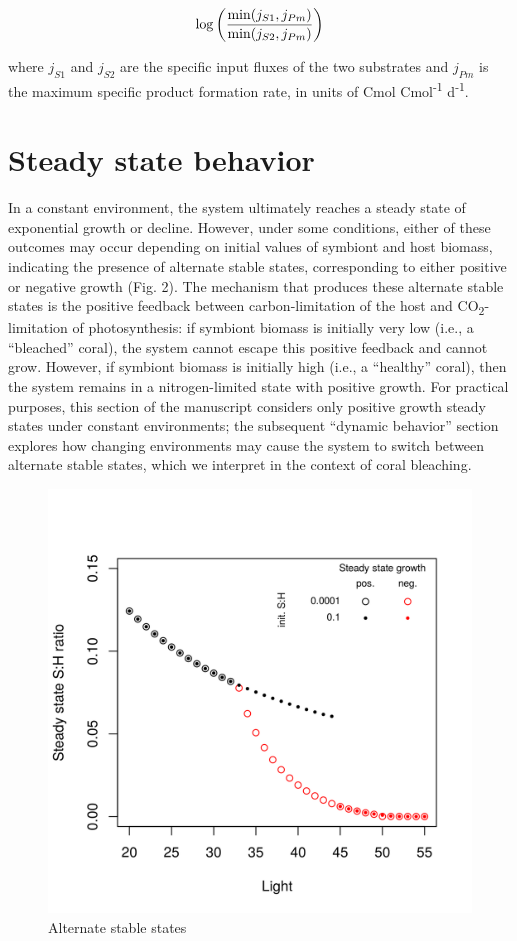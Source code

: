 \documentclass[]{elsarticle} %
\makeatletter
\def\maxwidth{\ifdim\Gin@nat@width>\linewidth\linewidth
\else\Gin@nat@width\fi}
\let\Oldincludegraphics\includegraphics
\renewcommand{\includegraphics}[1]{\Oldincludegraphics[width=\maxwidth]{#1}}
\makeatother
\begin{document}
\begin{equation} \log \bigg({{\min(j_{S1}, j_{Pm})} \over {\min(j_{S2}, j_{Pm})}}\bigg) \end{equation}

where \(j_{S1}\) and \(j_{S2}\) are the specific input fluxes of the two
substrates and \(j_{Pm}\) is the maximum specific product formation
rate, in units of Cmol Cmol\textsuperscript{-1} d\textsuperscript{-1}.

\section{Steady state behavior}\label{steady-state-behavior}

In a constant environment, the system ultimately reaches a steady state
of exponential growth or decline. However, under some conditions, either
of these outcomes may occur depending on initial values of symbiont and
host biomass, indicating the presence of alternate stable states,
corresponding to either positive or negative growth (Fig. 2). The
mechanism that produces these alternate stable states is the positive
feedback between carbon-limitation of the host and
CO\textsubscript{2}-limitation of photosynthesis: if symbiont biomass is
initially very low (i.e., a ``bleached'' coral), the system cannot
escape this positive feedback and cannot grow. However, if symbiont
biomass is initially high (i.e., a ``healthy'' coral), then the system
remains in a nitrogen-limited state with positive growth. For practical
purposes, this section of the manuscript considers only positive growth
steady states under constant environments; the subsequent ``dynamic
behavior'' section explores how changing environments may cause the
system to switch between alternate stable states, which we interpret in
the context of coral bleaching.

\begin{figure}[htbp]
\centering
\includegraphics{../img/Fig2.png}
\caption{Alternate stable states}
\end{figure}
\end{document}
